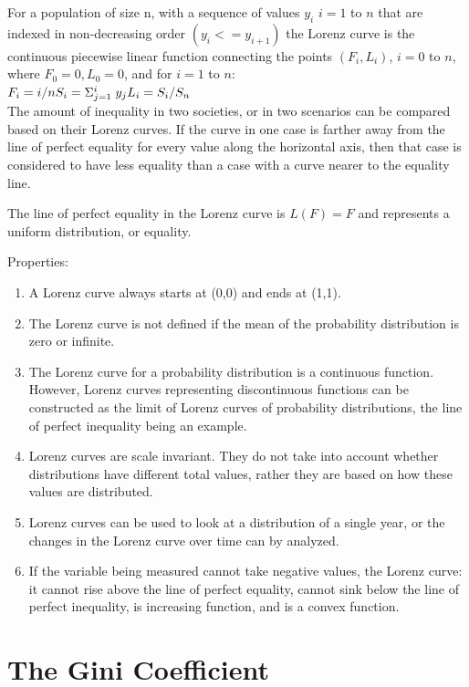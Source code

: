 \documentclass{howto}
\begin{document}
For a population of size n, with a sequence of values $y_{i}$ $i = 1$ to $n$ that are indexed in non-decreasing order $(y_{i} <= y_{i+1})$ the Lorenz curve is the continuous piecewise linear function connecting the points $( F_{i} , L_{i} )$, $i = 0$ to $n$, where $F_{0} = 0, L_{0} = 0$, and for $i = 1$ to $n$: \\

    $F_{i} = i/n \\
    S_{i} = \Sigma_{j=1}^i \; y_{j} \\
    L_{i} = S_{i} / S_{n}$ \\

The amount of inequality in two societies, or in two scenarios can be compared
based on their Lorenz curves.  If the curve in one case is farther away from
the line of perfect equality for every value along the horizontal axis, then
that case is considered to have less equality than a case with a curve nearer
to the equality line.

The line of perfect equality in the Lorenz curve is $L(F) = F$ and represents a uniform distribution, or equality.  

Properties: \begin{enumerate}
\item A Lorenz curve always starts at (0,0) and ends at (1,1).
\item The Lorenz curve is not defined if the mean of the probability distribution is zero or infinite.
\item The Lorenz curve for a probability distribution is a continuous function. 
However, Lorenz curves representing discontinuous functions can be constructed as the 
limit of Lorenz curves of probability distributions, the line of perfect inequality 
being an example.
\item Lorenz curves are scale invariant.  They do not take into account whether distributions have
different total values, rather they are based on how these values are distributed.  
\item Lorenz curves can be used to look at a distribution of a single year, or the changes in the Lorenz curve over time can by analyzed.
\item If the variable being measured cannot take negative values, the Lorenz curve: it cannot rise above the line of perfect equality, cannot sink below the line of perfect inequality, is increasing function, and is a convex function. 
\end{enumerate}

\section{The Gini Coefficient}
\end{document}

